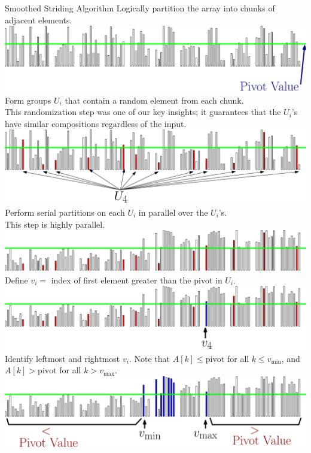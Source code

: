 \documentclass[table,serif,mathserif,final]{beamer}
\theoremstyle{remark}
\begin{document}
\begin{frame}{}
\begin{columns}[t]
\begin{column}{0.5\linewidth}
\begin{block}{\Huge Smoothed Striding Algorithm}
  \Huge
	Logically partition the array into chunks of adjacent elements.
	\includegraphics[width=\linewidth]{imgs/smoothedStridingAlgSim/sim1.eps}
	Form groups $U_i$ that contain a random element from each chunk. \\
  {\color{blue}This randomization step was one of our key insights; it guarantees that the $U_i$'s have similar compositions regardless of the input.}
	\includegraphics[width=\linewidth]{imgs/smoothedStridingAlgSim/sim2.eps}
	Perform serial partitions on each $U_i$ in parallel over the $U_i$'s. \\
  This step is highly parallel.
	\includegraphics[width=\linewidth]{imgs/smoothedStridingAlgSim/sim3.eps}
  Define $v_i = $ index of first element greater than the pivot in $U_i$. 
	\includegraphics[width=\linewidth]{imgs/smoothedStridingAlgSim/sim35.eps}
	Identify leftmost and rightmost $v_i$. Note that $A[k] \le \text{pivot}$ for all $k \le v_\min$, and $A[k] > \text{pivot}$ for all $k > v_{\max}$.
	\includegraphics[width=\linewidth]{imgs/smoothedStridingAlgSim/sim4.eps}

\end{block}
\end{column}
\end{columns}
\end{frame}
\end{document}
